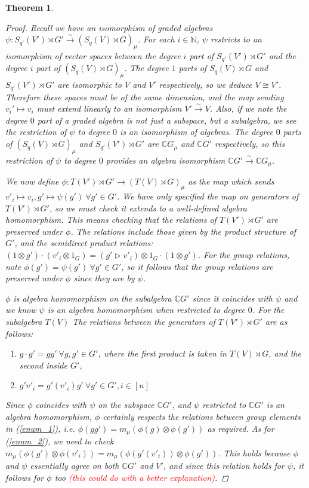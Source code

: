\documentclass[10pt]{article}
\newcommand{\bb}{\medbreak}
\newcommand{\nt}{\noindent}
\newcommand{\N}{\mathbb{N}}
\newcommand{\Cc }{\mathbb{C}}
\newcommand{\rt}{\xrightarrow{}}
\newcommand{\xrt}{\xrightarrow}
\newcommand{\cd}{\cdot}
\newtheorem{theorem}[lemma]{Theorem}
\theoremstyle{definition}
\begin{document}
\begin{theorem}
\begin{proof}
\iffalse
Recall we have an isomorphism of graded algebras $\psi:S_{q'}(V')\rtimes G'\xrt{\sim} (S_q(V)\rtimes G)_\mu$. For each $i\in \N$, $\psi$ restricts to an isomorphism of vector spaces between the degree $i$ part of $S_{q'}(V')\rtimes G'$ and the degree $i$ part of $(S_q(V)\rtimes G)_\mu$. The degree $1$ parts of $S_q(V)\rtimes G$ and $S_{q'}(V')\rtimes G'$ are isomorphic to $V$ and $V'$ respectively, so we deduce $V\cong V'$. Therefore these spaces must be of the same dimension, and the map sending $v_i'\mapsto v_i$ must extend linearly to an isomorphism $V'\xrt{\sim}V$. Also, if we note the degree $0$ part of a graded algebra is not just a subspace, but a subalgebra, we see the restriction of $\psi$ to degree $0$ is an isomorphism of \textit{algebras}. The degree $0$ parts of $(S_{q}(V)\rtimes G)_\mu$ and $S_{q'}(V')\rtimes G'$ are $\Cc  G_\mu$ and $\Cc  G'$ respectively, so this restriction of $\psi$ to degree $0$ provides an algebra isomorphism $\Cc  G'\xrt{\sim} \Cc  G_\mu$.\bb

\nt We now define $\phi:T(V')\rtimes G'\rt (T(V)\rtimes G)_\mu$ as the map which sends $v'_i\mapsto v_i, g'\mapsto \psi(g')\ \forall g'\in G'$. We have only specified the map on generators of $T(V')\rtimes G'$, so we must check it extends to a well-defined algebra homomorphism. This means checking that the relations of $T(V')\rtimes G'$ are preserved under $\phi$. The relations include those given by the product structure of $G'$, and the semidirect product relations: $(1\otimes g')\cdot (v'_i\otimes 1_G)=(g'\rhd v'_i)\otimes 1_G \cdot (1\otimes g')$. For the group relations, note $\phi(g')=\psi(g')\ \forall g'\in G'$, so it follows that the group relations are preserved under $\phi$ since they are by $\psi$.

$\phi$ is algebra homomorphism on the subalgebra $\Cc  G'$ since it coincides with $\psi$ and we know $\psi$ is an algebra homomorphism when restricted to degree $0$. For the subalgebra $T(V)$ The relations between the generators of $T(V')\rtimes G'$ are as follows: 
\begin{enumerate}
  \item\label{enum_1} $g\cd g'=gg'\ \forall g,g'\in G'$, where the first product is taken in $T(V)\rtimes G$, and the second inside $G'$, 
  \item\label{enum_2} $g'v'_i=g'(v'_i)g'\ \forall g'\in G',i\in [n]$ 
\end{enumerate}
Since $\phi$ coincides with $\psi$ on the subspace $\Cc  G'$, and $\psi$ restricted to $\Cc  G'$ is an algebra homomorphism, $\phi$ certainly respects the relations between group elements in (\ref{enum_1}), i.e. $\phi(gg')=m_\mu(\phi(g)\otimes \phi(g'))$ as required. As for (\ref{enum_2}), we need to check $m_\mu(\phi(g')\otimes \phi(v'_i))=m_\mu(\phi(g'(v'_i))\otimes \phi(g'))$. This holds because $\phi$ and $\psi$ essentially agree on both $\Cc  G'$ and $V'$, and since this relation holds for $\psi$, it follows for $\phi$ too \textcolor{red}{(this could do with a better explanation)}.\bb


\end{proof}
\end{theorem}
\end{document}
